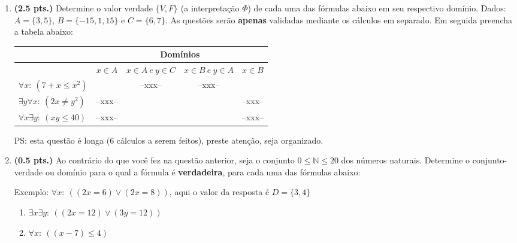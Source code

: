 \documentclass[a4paper,11pt]{article}
\begin{document}
\begin{enumerate}
\setlength{\itemsep}{-1pt}


\item {\bf (2.5 pts.)} Determine o valor verdade $\{V, F \}$ (a interpretação $\Phi $)
de cada uma das fórmulas abaixo em seu respectivo domínio. Dados: $A = \{ 3,  5 \}$, $B = \{ -15, 1, 15\}$ e  $C = \{ 6,  7 \}$.
As questões serão \textbf{apenas} validadas mediante os cálculos em separado.
 Em seguida preencha a tabela abaixo:

\begin{center}
\begin{tabular}{l|c|c|c|c} \hline \hline
 & \multicolumn{4}{c}{Domínios} \\ \hline
 & $ x \in A$ & $x \in A ~e~ y \in C$ & $x \in B ~e~ y \in A$ & $x \in B$ \\ \hline

$\forall x: ~ (7+x \leq x^2)$ & & --xxx-- & --xxx--  & \\ \hline
$\exists y \forall x: ~ (2x \neq y^2)$ & --xxx-- &  & & --xxx-- \\ \hline
$\forall x \exists y: ~ (xy \leq 40)$ & --xxx-- &  & & --xxx-- \\ \hline \hline
\end{tabular}
\end{center}
PS: esta questão é longa (6 cálculos a serem feitos), preste atenção, seja organizado.

\item {\bf (0.5 pts.)} Ao contrário  do que você fez na questão anterior, seja o conjunto $0 \leq \mathbb{N}\leq 20$ dos números naturais. Determine o conjunto-verdade ou domínio para o qual a fórmula é \textbf{verdadeira}, para cada  uma das fórmulas abaixo:

Exemplo: $\forall x: ~ ((2x = 6) \vee (2x = 8)) $,  aqui o valor da resposta é $D=\{3, 4\}$

\begin{enumerate}
\itemsep -2pt   
  \item $\exists x \exists y: ~ ((2x = 12) \vee (3y = 12)) $
      \item $\forall x: ~ ((x - 7) \le 4 )$
       

\end{enumerate}
\end{enumerate}
\end{document}
